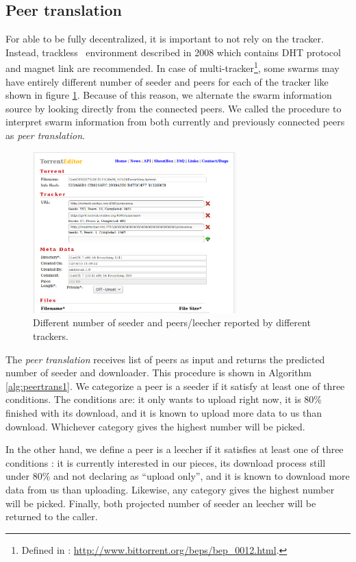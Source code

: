 \subsection{Peer translation}
For able to be fully decentralized, it is important to not rely on the tracker. Instead, trackless \bt~environment described in 2008 which contains DHT protocol \cite{2008:dht:loewenstern} and magnet link\cite{2008:magnet:hazel} are recommended. In case of multi-tracker\footnote{Defined in : \url{http://www.bittorrent.org/beps/bep_0012.html}.}, some swarms may have entirely different number of seeder and peers for each of the tracker like shown in figure \ref{fig:diffsr}. Because of this reason, we alternate the swarm information source by looking directly from the connected peers. We called the procedure to interpret swarm information from both currently and previously connected peers as \textit{peer translation}. 

\begin{figure}[ht]
	\centering
	\includegraphics[width=0.7\textwidth]{pics/diffsr.png}
	\caption{Different number of seeder and peers/leecher reported by different trackers.}
	\label{fig:diffsr}
\end{figure}

The \textit{peer translation} receives list of peers as input and returns the predicted number of seeder and downloader. This procedure is shown in Algorithm \ref{alg:peertrans1}. We categorize a peer is a seeder if it satisfy at least one of three conditions. The conditions are: it only wants to upload right now, it is 80\% finished with its download, and it is known to upload more data to us than download. Whichever category gives the highest number will be picked. 

In the other hand, we define a peer is a leecher if it satisfies at least one of three conditions : it is currently interested in our pieces, its download process still under 80\% and not declaring as ``upload only'', and it is known to download more data from us than uploading. Likewise, any category gives the highest number will be picked. Finally, both projected number of seeder an leecher will be returned to the caller.

